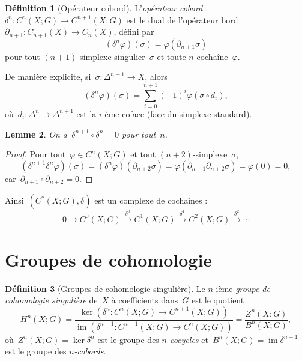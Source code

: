 \documentclass[12pt,a4paper,openany]{book}
\theoremstyle{definition}
\newtheorem{definition}{Définition}[chapter]
\theoremstyle{plain}
\newtheorem{lemme}[definition]{Lemme}
\theoremstyle{remark}
\DeclareMathOperator{\im}{im}
\begin{document}
\begin{definition}[Opérateur cobord]\label{def:cobord}
L'\emph{opérateur cobord} $\delta^n \colon C^n(X; G) \to C^{n+1}(X; G)$ est le dual
de l'opérateur bord~$\partial_{n+1} \colon C_{n+1}(X) \to C_n(X)$, défini par
\[
  (\delta^n \varphi)(\sigma) = \varphi(\partial_{n+1} \sigma)
\]
pour tout $(n+1)$-simplexe singulier~$\sigma$ et toute $n$-cochaîne~$\varphi$.

De manière explicite, si~$\sigma \colon \Delta^{n+1} \to X$, alors
\[
  (\delta^n \varphi)(\sigma) = \sum_{i=0}^{n+1} (-1)^i \varphi(\sigma \circ d_i),
\]
où~$d_i \colon \Delta^n \to \Delta^{n+1}$ est la $i$-ème coface
(face du simplexe standard).
\end{definition}

\begin{lemme}\label{lem:cobord-carre}
On a~$\delta^{n+1} \circ \delta^n = 0$ pour tout~$n$.
\end{lemme}

\begin{proof}
Pour tout~$\varphi \in C^n(X; G)$ et tout $(n+2)$-simplexe~$\sigma$,
\[
  (\delta^{n+1} \delta^n \varphi)(\sigma)
  = (\delta^n \varphi)(\partial_{n+2} \sigma)
  = \varphi(\partial_{n+1} \partial_{n+2} \sigma) = \varphi(0) = 0,
\]
car~$\partial_{n+1} \circ \partial_{n+2} = 0$.
\end{proof}

Ainsi~$(C^*(X; G), \delta)$ est un complexe de cochaînes :
\[
  0 \to C^0(X; G) \xrightarrow{\delta^0} C^1(X; G) \xrightarrow{\delta^1}
  C^2(X; G) \xrightarrow{\delta^2} \cdots
\]

\section{Groupes de cohomologie}\label{sec:groupes-cohomologie}

\begin{definition}[Groupes de cohomologie singulière]\label{def:cohomologie}
Le $n$-ième \emph{groupe de cohomologie singulière} de~$X$ à coefficients dans~$G$
est le quotient
\[
  H^n(X; G) = \frac{\ker(\delta^n \colon C^n(X;G) \to C^{n+1}(X;G))}
    {\im(\delta^{n-1} \colon C^{n-1}(X;G) \to C^n(X;G))}
  = \frac{Z^n(X; G)}{B^n(X; G)},
\]
où~$Z^n(X; G) = \ker \delta^n$ est le groupe des \emph{$n$-cocycles}
et~$B^n(X; G) = \im \delta^{n-1}$ est le groupe des \emph{$n$-cobords}.
\end{definition}
\end{document}
